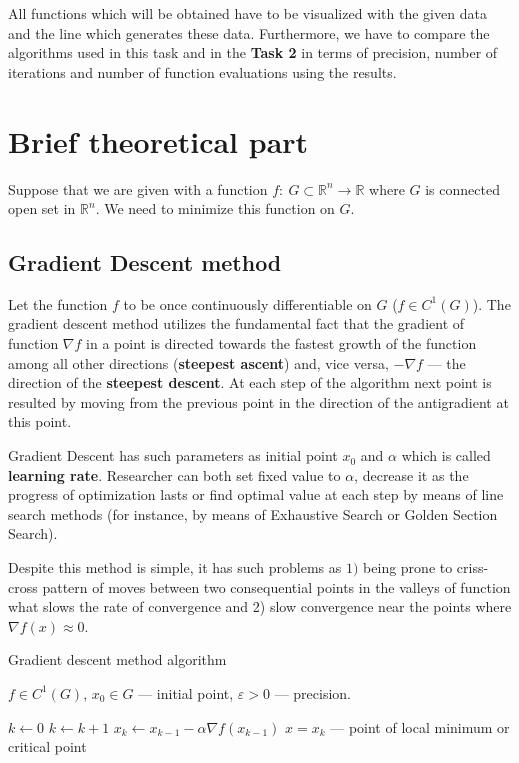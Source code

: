 \documentclass[12pt, bachelor, substylefile = algo_title.rtx]{disser}
\newcommand{\eps}{\varepsilon}
\newcommand{\Real}{\mathbb{R}}
\theoremstyle{definition}
\begin{document}
All functions which will be obtained have to be visualized with the given data and the line which generates these data. Furthermore, we have to compare the algorithms used in this task and in the \textbf{Task 2} in terms of precision, number of iterations and number of function evaluations using the results.

\section{Brief theoretical part}

Suppose that we are given with a function $f:\ G \subset \Real^n \to \Real$ where $G$ is connected open set in $\Real^n$. We need to minimize this function on $G$.

\subsection{Gradient Descent method}
Let the function $f$ to be once continuously differentiable on $G$ ($f \in C^1(G)$). The gradient descent method utilizes the fundamental fact that the gradient of function $\nabla f$ in a point is directed towards the fastest growth of the function among all other directions (\textbf{steepest ascent}) and, vice versa, $-\nabla f$ --- the direction of the \textbf{steepest descent}. At each step of the algorithm next point is resulted by moving from the previous point in the direction of the antigradient at this point. 

Gradient Descent has such parameters as initial point $x_0$ and $\alpha$ which is called \textbf{learning rate}. Researcher can both set fixed value to $\alpha$, decrease it as the progress of optimization lasts or find optimal value at each step by means of line search methods (for instance, by means of Exhaustive Search or Golden Section Search).

Despite this method is simple, it has such problems as $1)$ being prone to criss-cross pattern of moves between two consequential points in the valleys of function what slows the rate of convergence and 2) slow convergence near the points where $\nabla f(x) \approx 0$.

\begin{algorithm}[h]
\caption{Gradient descent method algorithm}
\label{alg: graddesc}
\begin{algorithmic}

\Require $f \in C^1(G)$, $x_0 \in G$ --- initial point, $\eps>0$ --- precision. 

\State $k \gets 0$
\While{$\|x_k - x_{k-1}\| > \eps$}
\State $k \gets k+1$
\State $x_k \gets x_{k-1} - \alpha \nabla f(x_{k-1})$
\EndWhile
\Ensure $\widehat{x} = x_k$ --- point of local minimum or critical point
\end{algorithmic}
\end{algorithm}
\end{document}
